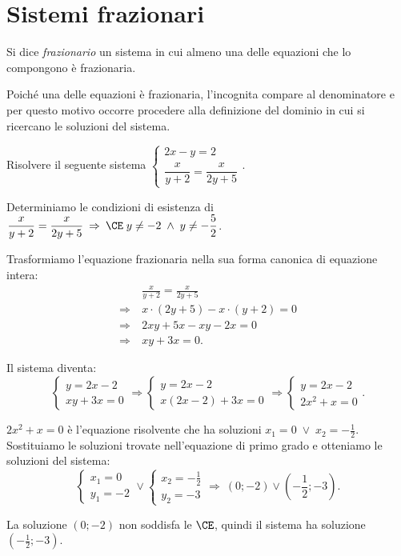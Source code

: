 \section{Sistemi frazionari}

\begin{definizione}
Si dice \emph{frazionario} un sistema in cui almeno una delle equazioni che lo compongono è frazionaria.
\end{definizione}

Poiché una delle equazioni è frazionaria, l'incognita compare al denominatore e per questo motivo occorre procedere alla definizione del dominio in cui si ricercano le soluzioni del sistema.

\begin{exrig}
\begin{esempio}
Risolvere il seguente sistema $\left\{\begin{array}{l}2x-y=2 \\\dfrac x{y+2}=\dfrac x{2y+5}\end{array}\right.$.

Determiniamo le condizioni di esistenza di $ \dfrac x{y+2}=\dfrac x{2y+5} \:\Rightarrow\:\CE\; y\neq -2\;\wedge\; y\neq -\dfrac 5 2$.

Trasformiamo l'equazione frazionaria nella sua forma canonica di equazione intera:
\begin{align*}
 &\frac x{y+2}=\frac x{2y+5}\\
\Rightarrow\: & x\cdot (2y+5)-x\cdot (y+2)=0\\
\Rightarrow\: & 2{xy}+5x-{xy}-2x=0\\
\Rightarrow\: & xy+3x=0.
\end{align*}

Il sistema diventa: 
\[\left\{\begin{array}{l}y=2x-2\\
xy+3x=0\end{array}\right.
\Rightarrow \left\{\begin{array}{l}y=2x-2\\
x(2x-2)+3x=0\end{array}\right.
\Rightarrow \left\{\begin{array}{l}y=2x-2\\
2x^2+x=0\end{array}\right..\]

$2x^2+x=0$ è l'equazione risolvente che ha soluzioni $x_1=0\;\vee\; x_2=-\frac 1 2$.
Sostituiamo le soluzioni trovate nell'equazione di primo grado e otteniamo le soluzioni del sistema: 
\[\left\{\begin{array}{l}x_1=0 \\
y_1=-2\end{array}\right.\vee 
\left\{\begin{array}{l}x_2=-\frac 1 2\\
y_2=-3\end{array}\right. 
\Rightarrow\:\left(0;-2\right)\vee \left(-\frac 1 2;-3\right).\]

La soluzione $(0;-2)$ non soddisfa le $\CE$, quindi il sistema ha soluzione $\left(-\frac 1 2;-3\right)$.
\end{esempio}
\end{exrig}

